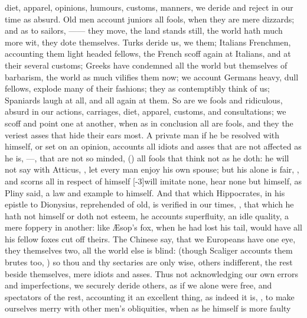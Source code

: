 {diet, apparel, opinions, humours, customs, manners, we deride and
reject in our time as absurd. Old men account juniors all fools, when
they are mere dizzards; and as to sailors, ------ they move, the land stands still, the world hath much more
wit, they dote themselves. Turks deride us, we them; Italians
Frenchmen, accounting them light headed fellows, the French scoff again
at Italians, and at their several customs; Greeks have condemned all
the world but themselves of barbarism, the world as much vilifies them
now; we account Germans heavy, dull fellows, explode many of their
fashions; they as contemptibly think of us; Spaniards laugh at all, and
all again at them. So are we fools and ridiculous, absurd in our
actions, carriages, diet, apparel, customs, and consultations; we 
scoff and point one at another, when as in conclusion all are fools,
 and they the veriest asses that hide their ears most. A private
man if he be resolved with himself, or set on an opinion, accounts all
idiots and asses that are not affected as he is, ---, that are not so minded, () all fools that think not as he
doth: he will not say with Atticus, ,
let every man enjoy his own spouse; but his alone is fair, ,
\etc{} and scorns all in respect of himself [-3\baselineskip]will imitate none, hear
none but himself, as Pliny said, a law and example to himself. And
that which Hippocrates, in his epistle to Dionysius, reprehended of
old, is verified in our times, , that which he hath not himself or doth
not esteem, he accounts superfluity, an idle quality, a mere foppery in
another: like \AE{}sop's fox, when he had lost his tail, would have all
his fellow foxes cut off theirs. The Chinese say, that we Europeans
have one eye, they themselves two, all the world else is blind: (though
Scaliger accounts them brutes too, ) so thou and thy
sectaries are only wise, others indifferent, the rest beside
themselves, mere idiots and asses. Thus not acknowledging our own
errors and imperfections, we securely deride others, as if we alone
were free, and spectators of the rest, accounting it an excellent
thing, as indeed it is, , to make ourselves
merry with other men's obliquities, when as he himself is more faulty
}
